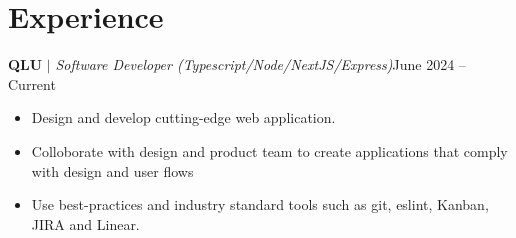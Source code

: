 
\section{Experience}
  \resumeSubHeadingListStart

          
          \resumeProjectHeading
          {\textbf{QLU}\vspace{8pt} $|$ \footnotesize\emph{Software Developer (Typescript/Node/NextJS/Express)}}{June 2024 -- Current}
            \begin{itemize}
              \item 
              Design and develop cutting-edge web application. 
              \item 
              Colloborate with design and product team to create applications that comply with design and user flows
              \item 
              Use best-practices and industry standard tools such as git, eslint, Kanban, JIRA and Linear. 
          \end{itemize}



    \resumeSubHeadingListEnd